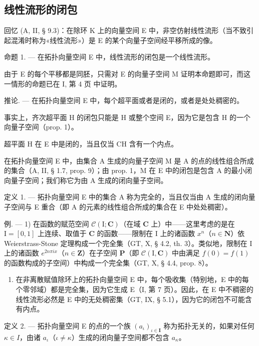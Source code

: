\subsection{线性流形的闭包}

回忆 (A, II, § 9.3)：在除环 K 上的向量空间 E 中，非空仿射线性流形（当不致引起混淆时称为«线性流形»）是 E 的某个向量子空间经平移所成的像。

命题 1. --- 在拓扑向量空间 E 中，线性流形的闭包是一个线性流形。

由于 E 的每个平移都是同胚，只需对 E 的向量子空间 M 证明本命题即可，而这一情形的命题已在 I, 第 4 页 中证明。

推论. --- 在拓扑向量空间 E 中，每个超平面或者是闭的，或者是处处稠密的。

事实上，齐次超平面 H 的闭包只能是 H 或整个空间 E，因为它是包含 H 的一个向量子空间（prop. 1）。

超平面 H 在 E 中是闭的，当且仅当 CH 含有一个内点。

在拓扑向量空间 E 中，由集合 A 生成的向量子空间 M 是 A 的点的线性组合所成的集合（A, II, § 1.7, prop. 9）；由 prop. 1，M 在 E 中的闭包是包含 A 的最小闭向量子空间；我们称它为由 A 生成的闭向量子空间。

定义 1. --- 拓扑向量空间 E 中的集合 A 称为完全的，当且仅当由 A 生成的闭向量子空间与 E 重合（即 A 的元素的线性组合所成的集合在 E 中处处稠密）。

例. --- 1) 在函数的赋范空间 \(\mathcal{C}(\mathrm{I};\mathbf{C})\)（在域 \(\mathbf{C}\) 上）中——这里考虑的是在 \(\mathrm{I} = [0,1]\) 上连续、取值于 \(\mathbf{C}\) 的函数——限制在 \(\mathrm{I}\) 上的诸函数 \(x^n\)（\(n\in \mathbf{N}\)）依 Weierstrass-Stone 定理构成一个完全集（GT, X, § 4.2, th. 3）。类似地，限制在 \(\mathrm{I}\) 上的诸函数 \(e^{2n\pi ix}\)（\(n\in \mathbf{Z}\)）在子空间 \(\mathbf{P}\)（即 \(\mathcal{C}(\mathrm{I},\mathbf{C})\) 中由满足 \(f(0) = f(1)\) 的函数构成的子空间）中构成一个完全集（GT, X, § 4.4, prop. 8）。

\begin{enumerate}
\def\labelenumi{\arabic{enumi})}
\setcounter{enumi}{1}
\tightlist
\item
  在非离散赋值除环上的拓扑向量空间 E 中，每个吸收集（特别地，E 中的每个零邻域）都是完全集，因为它生成 E（I, 第 7 页）。因此，在 E 中不稠密的线性流形必然是 E 中的无处稠密集（GT, IX, § 5.1），因为它的闭包不可能含有内点。
\end{enumerate}

定义 2. --- 拓扑向量空间 E 的点的一个族 \((a_{\iota})_{\iota\in\mathbf{I}}\) 称为拓扑无关的，如果对任何 \(\kappa\in I\)，由诸 \(a_{\iota}\)（\(\iota\neq\kappa\)）生成的闭向量子空间都不包含 \(a_{\kappa}\)。

